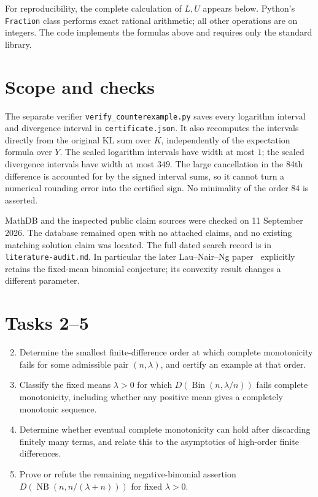 \documentclass[11pt]{article}
\begin{document}
For reproducibility, the complete calculation of $L,U$ appears below.
Python's \texttt{Fraction} class performs exact rational arithmetic;
all other operations are on integers. The code implements the formulas
above and requires only the standard library.



\section*{Scope and checks}

The separate verifier \texttt{verify\_counterexample.py} saves every
logarithm interval and divergence interval in \texttt{certificate.json}.
It also recomputes the intervals directly from the original KL sum over
$K$, independently of the expectation formula over $Y$.
The scaled logarithm intervals have width at most $1$; the scaled
divergence intervals have width at most $349$. The large cancellation
in the 84th difference is accounted for by the signed interval sums,
so it cannot turn a numerical rounding error into the certified sign.
No minimality of the order $84$ is asserted.

MathDB and the inspected public claim sources were checked on
11 September 2026. The database remained open with no attached claims,
and no existing matching solution claim was located. The full dated search
record is in \texttt{literature-audit.md}. In particular the later
Lau--Nair--Ng paper~\cite{LNN} explicitly retains the fixed-mean binomial
conjecture; its convexity result changes a different parameter.

\section*{Tasks 2--5}

\begin{enumerate}
\setcounter{enumi}{1}
\item Determine the smallest finite-difference order at which
complete monotonicity fails for some admissible pair $(n,\lambda)$,
and certify an example at that order.
\item Classify the fixed means $\lambda>0$ for which
$D(\operatorname{Bin}(n,\lambda/n))$ fails complete monotonicity,
including whether any positive mean gives a completely monotonic sequence.
\item Determine whether eventual complete monotonicity can hold after
discarding finitely many terms, and relate this to the asymptotics of
high-order finite differences.
\item Prove or refute the remaining negative-binomial assertion
$D(\operatorname{NB}(n,n/(\lambda+n)))$ for fixed $\lambda>0$.
\end{enumerate}
\end{document}
